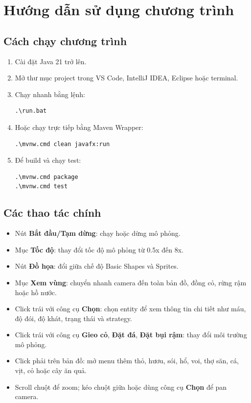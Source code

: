 \documentclass[12pt,a4paper]{article}
\begin{document}
\section{Hướng dẫn sử dụng chương trình}

\subsection{Cách chạy chương trình}

\begin{enumerate}
    \item Cài đặt Java 21 trở lên.
    \item Mở thư mục project trong VS Code, IntelliJ IDEA, Eclipse hoặc terminal.
    \item Chạy nhanh bằng lệnh:
\begin{verbatim}
.\run.bat
\end{verbatim}
    \item Hoặc chạy trực tiếp bằng Maven Wrapper:
\begin{verbatim}
.\mvnw.cmd clean javafx:run
\end{verbatim}
    \item Để build và chạy test:
\begin{verbatim}
.\mvnw.cmd package
.\mvnw.cmd test
\end{verbatim}
\end{enumerate}

\subsection{Các thao tác chính}

\begin{itemize}
    \item Nút \textbf{Bắt đầu/Tạm dừng}: chạy hoặc dừng mô phỏng.
    \item Mục \textbf{Tốc độ}: thay đổi tốc độ mô phỏng từ 0.5x đến 8x.
    \item Nút \textbf{Đồ họa}: đổi giữa chế độ Basic Shapes và Sprites.
    \item Mục \textbf{Xem vùng}: chuyển nhanh camera đến toàn bản đồ, đồng cỏ, rừng rậm hoặc hồ nước.
    \item Click trái với công cụ \textbf{Chọn}: chọn entity để xem thông tin chi tiết như máu, độ đói, độ khát, trạng thái và strategy.
    \item Click trái với công cụ \textbf{Gieo cỏ}, \textbf{Đặt đá}, \textbf{Đặt bụi rậm}: thay đổi môi trường mô phỏng.
    \item Click phải trên bản đồ: mở menu thêm thỏ, hươu, sói, hổ, voi, thợ săn, cá, vịt, cỏ hoặc cây ăn quả.
    \item Scroll chuột để zoom; kéo chuột giữa hoặc dùng công cụ \textbf{Chọn} để pan camera.
\end{itemize}
\end{document}
